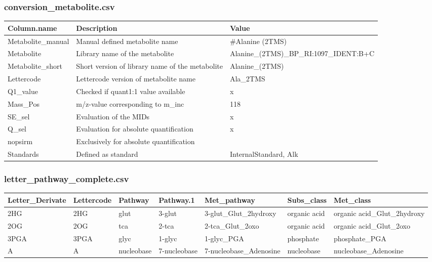 \documentclass[]{book}
\begin{document}
\hypertarget{app:conse}{%
\subsubsection{conversion\_metabolite.csv}\label{app:conse}}

\begin{tabu} to 
\toprule
Column.name & Description & Value\\
\midrule
{}  Metabolite\_manual & Manual defined metabolite name & \#Alanine (2TMS)\\
Metabolite & Library name of the metabolite & Alanine\_(2TMS)\_BP\_RI:1097\_IDENT:B+C\\
  Metabolite\_short & Short version of library name of the metabolite & Alanine\_(2TMS)\\
Lettercode & Lettercode version of metabolite name & Ala\_2TMS\\
  Q1\_value & Checked if quant1:1 value available & x\\
\addlinespace
Mass\_Pos & m/z-value corresponding to m\_inc & 118\\
  SE\_sel & Evaluation of the MIDs & x\\
Q\_sel & Evaluation for absolute quantification & x\\
  nopsirm & Exclusively for absolute quantification & \\
Standards & Defined as standard & InternalStandard, Alk\\
\bottomrule
\end{tabu}

\hypertarget{app:pathway}{%
\subsubsection{letter\_pathway\_complete.csv}\label{app:pathway}}

\begin{tabu} to 
\toprule
Letter\_Derivate & Lettercode & Pathway & Pathway.1 & Met\_pathway & Subs\_class & Met\_class\\
\midrule
{}  2HG & 2HG & glut & 3-glut & 3-glut\_Glut\_2hydroxy & organic acid & organic acid\_Glut\_2hydroxy\\
2OG & 2OG & tca & 2-tca & 2-tca\_Glut\_2oxo & organic acid & organic acid\_Glut\_2oxo\\
  3PGA & 3PGA & glyc & 1-glyc & 1-glyc\_PGA & phosphate & phosphate\_PGA\\
A & A & nucleobase & 7-nucleobase & 7-nucleobase\_Adenosine & nucleobase & nucleobase\_Adenosine\\
\bottomrule
\end{tabu}
\end{document}
